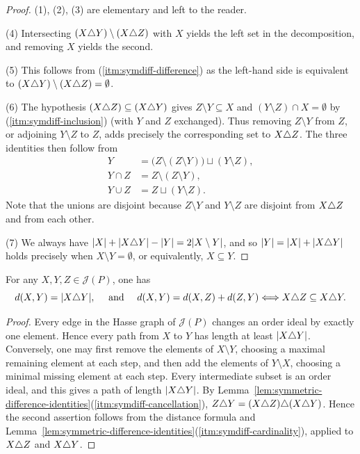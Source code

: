 \documentclass[a4paper,leqno]{amsart}
\begin{document}
\begin{proof}
(1), (2), (3) are elementary and left to the reader.

(4)\; Intersecting $(X{\mathbin{\triangle}} Y)\setminus(X{\mathbin{\triangle}} Z)$ with $X$ yields the left set in the decomposition, and removing $X$ yields the second.

(5)\; This follows from \textup{(\ref{itm:symdiff-difference})} as the left-hand side is equivalent to $(X{\mathbin{\triangle}} Y)\setminus (X{\mathbin{\triangle}} Z)=\emptyset$.

(6)\; The hypothesis $(X{\mathbin{\triangle}} Z)\subseteq(X{\mathbin{\triangle}} Y)$ gives $Z\setminus Y\subseteq X$ and $(Y\setminus Z)\cap X=\emptyset$ by \textup{(\ref{itm:symdiff-inclusion})} (with $Y$ and $Z$ exchanged). Thus removing $Z\setminus Y$ from $Z$, or adjoining $Y\setminus Z$ to $Z$, adds precisely the corresponding set to $X{\mathbin{\triangle}} Z$. The three identities then follow from
\[
\begin{aligned}
 Y&=\bigl(Z\setminus(Z\setminus Y)\bigr)\sqcup(Y\setminus Z),\\
 Y\cap Z&=Z\setminus(Z\setminus Y),\\
 Y\cup Z&=Z\sqcup(Y\setminus Z).
\end{aligned}
\]
Note that the unions are disjoint because $Z\setminus Y$ and $Y\setminus Z$ are disjoint from $X{\mathbin{\triangle}} Z$ and from each other.

(7)\; We always have $|X|+|X{\mathbin{\triangle}} Y|-|Y|=2|X\setminus Y|$, and so $|Y|=|X|+|X{\mathbin{\triangle}} Y|$ holds precisely when $X\setminus Y=\emptyset$, or equivalently, $X\subseteq Y$.
\end{proof}

\begin{lem}\label{lem:d(X,Y)}
For any $X,Y,Z\in\mathcal J(P)$, one has
\[
d(X,Y)=|X{\mathbin{\triangle}} Y|, \quad\text{ and }\quad 
d(X,Y)=d(X,Z)+d(Z,Y)
\Longleftrightarrow
X{\mathbin{\triangle}} Z\subseteq X{\mathbin{\triangle}} Y.
\]
\end{lem}

\begin{proof}
Every edge in the Hasse graph of $\mathcal J(P)$ changes an order ideal by exactly one element. Hence every path from $X$ to $Y$ has length at least $|X{\mathbin{\triangle}} Y|$.  
Conversely, one may first remove the elements of $X\setminus Y$, choosing a maximal remaining element at each step, and then add the elements of $Y\setminus X$, choosing a minimal missing element at each step.  
Every intermediate subset is an order ideal, and this gives a path of length $|X{\mathbin{\triangle}} Y|$. By Lemma~\ref{lem:symmetric-difference-identities}\textup{(\ref{itm:symdiff-cancellation})}, $Z{\mathbin{\triangle}} Y=(X{\mathbin{\triangle}} Z){\mathbin{\triangle}}(X{\mathbin{\triangle}} Y)$. Hence the second assertion follows from the distance formula and Lemma~\ref{lem:symmetric-difference-identities}\textup{(\ref{itm:symdiff-cardinality})}, applied to $X{\mathbin{\triangle}} Z$ and $X{\mathbin{\triangle}} Y$.
\end{proof}
\end{document}
